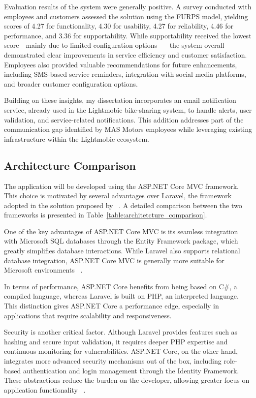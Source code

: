 Evaluation results of the system were generally positive. A survey conducted with employees and customers assessed the solution using the \ac{FURPS} model, yielding scores of 4.27 for functionality, 4.30 for usability, 4.27 for reliability, 4.46 for performance, and 3.36 for supportability. While supportability received the lowest score—mainly due to limited configuration options ~\cite{MAS_MOTORS}—the system overall demonstrated clear improvements in service efficiency and customer satisfaction. Employees also provided valuable recommendations for future enhancements, including SMS-based service reminders, integration with social media platforms, and broader customer configuration options.

Building on these insights, my dissertation incorporates an email notification service, already used in the Lightmobie bike-sharing system, to handle alerts, user validation, and service-related notifications. This addition addresses part of the communication gap identified by MAS Motors employees while leveraging existing infrastructure within the Lightmobie ecosystem.

\subsection{Architecture Comparison}
  
The application will be developed using the ASP.NET Core MVC framework. This choice is motivated by several advantages over Laravel, the framework adopted in the solution proposed by ~\citet{MAS_MOTORS}. A detailed comparison between the two frameworks is presented in Table~\ref{table:architetcture_comparison}.

One of the key advantages of ASP.NET Core MVC is its seamless integration with Microsoft SQL databases through the Entity Framework package, which greatly simplifies database interactions. While Laravel also supports relational database integration, ASP.NET Core MVC is generally more suitable for Microsoft environments ~\cite{asp_net_vs_laravel}.

In terms of performance, ASP.NET Core benefits from being based on C\#, a compiled language, whereas Laravel is built on PHP, an interpreted language. This distinction gives ASP.NET Core a performance edge, especially in applications that require scalability and responsiveness.

Security is another critical factor. Although Laravel provides features such as hashing and secure input validation, it requires deeper PHP expertise and continuous monitoring for vulnerabilities. ASP.NET Core, on the other hand, integrates more advanced security mechanisms out of the box, including role-based authentication and login management through the Identity Framework. These abstractions reduce the burden on the developer, allowing greater focus on application functionality ~\cite{asp_net_vs_laravel}.

